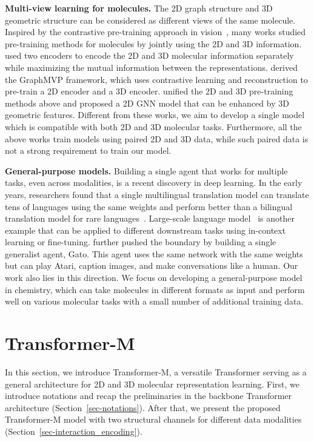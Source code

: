 \documentclass{article} \usepackage[dvipsnames]{xcolor}
\begin{document}
\textbf{Multi-view learning for molecules. } 
The 2D graph structure and 3D geometric structure can be considered as different views of the same molecule. Inspired by the contrastive pre-training approach in vision~\citep{chen2020simple,he2020momentum,radford2021learning}, many works studied pre-training methods for molecules by jointly using the 2D and 3D information. \citet{stark20223d} used two encoders to encode the 2D and 3D molecular information separately while maximizing the mutual information between the representations. \citet{liu2021pre} derived the GraphMVP framework, which uses contrastive learning and reconstruction to pre-train a 2D encoder and a 3D encoder. \citet{zhu2022unified} unified the 2D and 3D pre-training methods above and proposed a 2D GNN model that can be enhanced by 3D geometric features. Different from these works, we aim to develop a single model which is compatible with both 2D and 3D molecular tasks. Furthermore, all the above works train models using paired 2D and 3D data, while such paired data is not a strong requirement to train our model.

\textbf{General-purpose models. }
Building a single agent that works for multiple tasks, even across modalities, is a recent discovery in deep learning. In the early years, researchers found that a single multilingual translation model can translate tens of languages using the same weights and perform better than a bilingual translation model for rare languages~\citep{lample2019cross,conneau2019unsupervised,xue2020mt5,liu2020multilingual}. Large-scale language model~\citep{devlin2019bert,brown2020language} is another example that can be applied to different downstream tasks using in-context learning or fine-tuning. \citet{reed2022generalist} further pushed the boundary by building a single generalist agent, Gato. This agent uses the same network with the same weights but can play Atari, caption images, and make conversations like a human. Our work also lies in this direction. We focus on developing a general-purpose model in chemistry, which can take molecules in different formats as input and perform well on various molecular tasks with a small number of additional training data.

\vspace{-10pt}
\section{Transformer-M}
\label{sec-method}
\vspace{-8pt}
In this section, we introduce Transformer-M, a versatile Transformer serving as a general architecture for 2D and 3D molecular representation learning. First, we introduce notations and recap the preliminaries in the backbone Transformer architecture (Section~\ref{sec-notations}). After that, we present the proposed Transformer-M model with two structural channels for different data modalities (Section~\ref{sec-interaction_encoding}).
\end{document}
